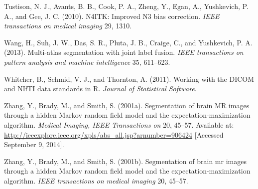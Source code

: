 \documentclass[utf8]{frontiersSCNS}
\begin{document}
\leavevmode\hypertarget{ref-n4}{}%
Tustison, N. J., Avants, B. B., Cook, P. A., Zheng, Y., Egan, A., Yushkevich, P. A., and Gee, J. C. (2010). N4ITK: Improved N3 bias correction. \emph{IEEE transactions on medical imaging} 29, 1310.

\leavevmode\hypertarget{ref-malf}{}%
Wang, H., Suh, J. W., Das, S. R., Pluta, J. B., Craige, C., and Yushkevich, P. A. (2013). Multi-atlas segmentation with joint label fusion. \emph{IEEE transactions on pattern analysis and machine intelligence} 35, 611--623.

\leavevmode\hypertarget{ref-orodicom}{}%
Whitcher, B., Schmid, V. J., and Thornton, A. (2011). Working with the DICOM and NIfTI data standards in R. \emph{Journal of Statistical Software}.

\leavevmode\hypertarget{ref-zhang_segmentation_2001}{}%
Zhang, Y., Brady, M., and Smith, S. (2001a). Segmentation of brain MR images through a hidden Markov random field model and the expectation-maximization algorithm. \emph{Medical Imaging, IEEE Transactions on} 20, 45--57. Available at: \url{http://ieeexplore.ieee.org/xpls/abs_all.jsp?arnumber=906424} {[}Accessed September 9, 2014{]}.

\leavevmode\hypertarget{ref-zhang2001segmentation}{}%
Zhang, Y., Brady, M., and Smith, S. (2001b). Segmentation of brain mr images through a hidden Markov random field model and the expectation-maximization algorithm. \emph{IEEE transactions on medical imaging} 20, 45--57.
\end{document}
